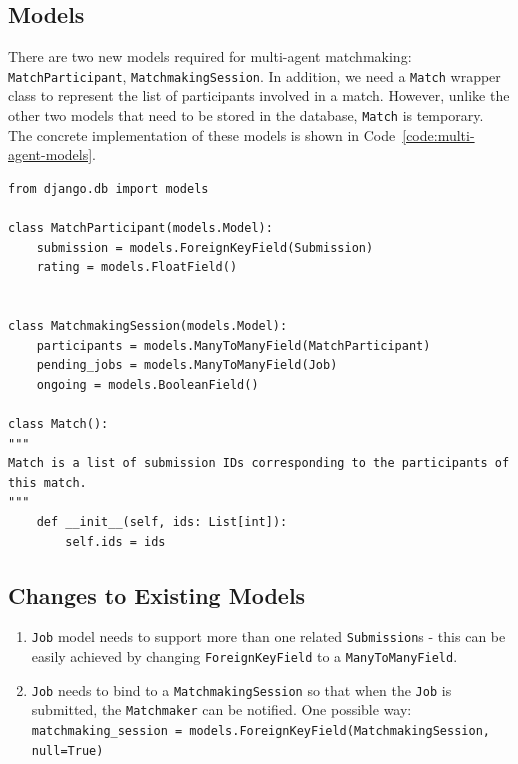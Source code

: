 \subsection{Models}
There are two new models required for multi-agent matchmaking: \texttt{MatchParticipant}, \texttt{MatchmakingSession}. In addition, we need a \texttt{Match} wrapper class to represent the list of participants involved in a match. However, unlike the other two models that need to be stored in the database, \texttt{Match} is temporary. The concrete implementation of these models is shown in Code~\ref{code:multi-agent-models}.

\begin{code}
\begin{verbatim}
from django.db import models

class MatchParticipant(models.Model):
    submission = models.ForeignKeyField(Submission)
    rating = models.FloatField()
    

class MatchmakingSession(models.Model):
    participants = models.ManyToManyField(MatchParticipant)
    pending_jobs = models.ManyToManyField(Job)
    ongoing = models.BooleanField()

class Match():
"""
Match is a list of submission IDs corresponding to the participants of this match.
"""
    def __init__(self, ids: List[int]):
        self.ids = ids
\end{verbatim}
\label{code:multi-agent-models}
\end{code}

\subsection{Changes to Existing Models}
\begin{enumerate}
    \item \texttt{Job} model needs to support more than one related \texttt{Submission}s - this can be easily achieved by changing \texttt{ForeignKeyField} to a \texttt{ManyToManyField}.
    \item \texttt{Job} needs to bind to a \texttt{MatchmakingSession} so that when the \texttt{Job} is submitted, the \texttt{Matchmaker} can be notified. One possible way:\\ \texttt{matchmaking\_session = models.ForeignKeyField(MatchmakingSession, null=True)}
\end{enumerate}

